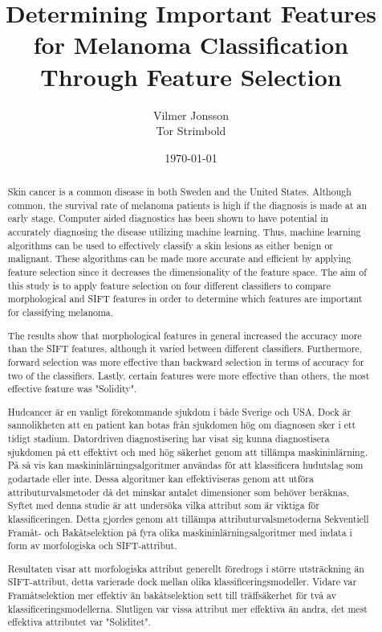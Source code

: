 \documentclass{kththesis}
\title{Determining Important Features for Melanoma Classification Through Feature Selection}
\author{Vilmer Jonsson \\ Tor Strimbold}
\date{\today}
\begin{document}
\frontmatter

\titlepage

\begin{abstract}
  Skin cancer is a common disease in both Sweden and the United States. Although common, the survival rate of melanoma patients is high if the diagnosis is made at an early stage. Computer aided diagnostics has been shown to have potential in accurately diagnosing the disease utilizing machine learning. Thus, machine learning algorithms can be used to effectively classify a skin lesions as either benign or malignant. These algorithms can be made more accurate and efficient by applying feature selection since it decreases the dimensionality of the feature space. The aim of this study is to apply feature selection on four different classifiers to compare morphological and SIFT features in order to determine which features are important for classifying melanoma.
  
  The results show that morphological features in general increased the accuracy more than the SIFT features, although it varied between different classifiers. Furthermore, forward selection was more effective than backward selection in terms of accuracy for two of the classifiers. Lastly, certain features were more effective than others, the most effective feature was "Solidity".
\end{abstract}


\begin{otherlanguage}{swedish}
  \begin{abstract}
    Hudcancer är en vanligt förekommande sjukdom i både Sverige och USA. Dock är sannolikheten att en patient kan botas från sjukdomen hög om diagnosen sker i ett tidigt stadium. Datordriven diagnostisering har visat sig kunna diagnostisera sjukdomen på ett effektivt och med hög säkerhet genom att tillämpa maskininlärning. På så vis kan maskininlärningsalgoritmer användas för att klassificera hudutslag som godartade eller inte. Dessa algoritmer kan effektiviseras genom att utföra attributurvalsmetoder då det minskar antalet dimensioner som behöver beräknas. Syftet med denna studie är att undersöka vilka attribut som är viktiga för klassificeringen. Detta gjordes genom att tillämpa attributurvalsmetoderna Sekventiell Framåt- och Bakåtselektion på fyra olika maskininlärningsalgoritmer med indata i form av morfologiska och SIFT-attribut.
    
    Resultaten visar att morfologiska attribut generellt föredrogs i större utsträckning än SIFT-attribut, detta varierade dock mellan olika klassificeringsmodeller. Vidare var Framåtselektion mer effektiv än bakåtselektion sett till träffsäkerhet för två av klassificeringsmodellerna. Slutligen var vissa attribut mer effektiva än andra, det mest effektiva attributet var "Soliditet".
  \end{abstract}
\end{otherlanguage}
\end{document}
